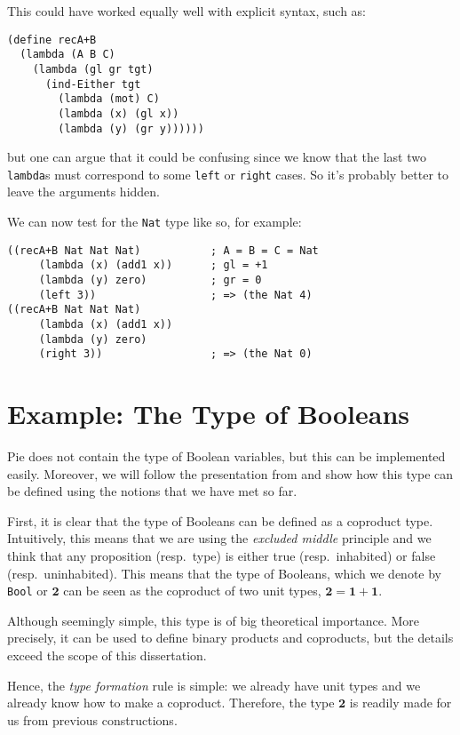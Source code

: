This could have worked equally well with explicit syntax, such as:
{
  \small
\begin{verbatim}
(define recA+B
  (lambda (A B C)
    (lambda (gl gr tgt)
      (ind-Either tgt
        (lambda (mot) C)
        (lambda (x) (gl x))
        (lambda (y) (gr y))))))
\end{verbatim}
}
but one can argue that it could be confusing since we know that the last two
\texttt{lambda}s must correspond to some \texttt{left} or \texttt{right} cases.
So it's probably better to leave the arguments hidden.

We can now test for the \texttt{Nat} type like so, for example:
{
  \small
\begin{verbatim}
((recA+B Nat Nat Nat)           ; A = B = C = Nat
     (lambda (x) (add1 x))      ; gl = +1
     (lambda (y) zero)          ; gr = 0
     (left 3))                  ; => (the Nat 4)
((recA+B Nat Nat Nat)
     (lambda (x) (add1 x))
     (lambda (y) zero)
     (right 3))                 ; => (the Nat 0)
\end{verbatim}
}

\section{Example: The Type of Booleans}

Pie does not contain the type of Boolean variables, but this can
be implemented easily. Moreover, we will follow the presentation from
\cite[\S1.8]{hott} and show how this type can be defined using the notions
that we have met so far.

First, it is clear that the type of Booleans can be defined as a coproduct
type. Intuitively, this means that we are using the \emph{excluded middle}
principle and we think that any proposition (resp.\ type) is either true
(resp.\ inhabited) or false (resp.\ uninhabited). This means that the type
of Booleans, which we denote by \texttt{Bool} or $ \pmb{2} $ can be seen as
the coproduct of two unit types, $ \pmb{2} = \pmb{1} + \pmb{1} $.

Although seemingly simple, this type is of big theoretical importance. More
precisely, it can be used to define binary products and coproducts, but the
details exceed the scope of this dissertation.

Hence, the \emph{type formation} rule is simple: we already have unit types
and we already know how to make a coproduct. Therefore, the type $ \pmb{2} $
is readily made for us from previous constructions.

